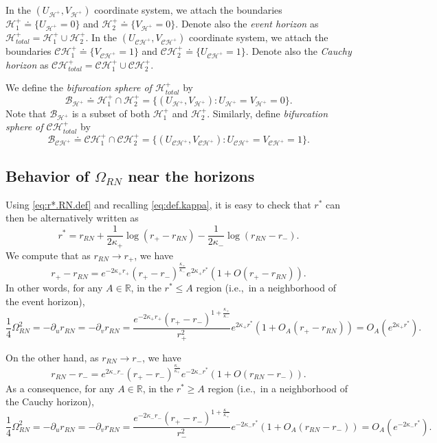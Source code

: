 \documentclass[10pt, reqno]{amsart}
\theoremstyle{definition}
\theoremstyle{remark}
\numberwithin{equation}{section}
\newcommand{\rd}{\partial}
\newcommand{\0}{\emptyset}
\newcommand{\Omg}{\Omega}
\newcommand{\calC}{\mathcal C}
\newcommand{\calH}{\mathcal H}
\newcommand{\f}{\frac}
\newcommand{\CH}{\calC \calH^{+}}		%
\newcommand{\EH}{\calH^{+}}
\begin{document}
In the $(U_{\EH},V_{\EH})$ coordinate system, we attach the boundaries $\EH_1\doteq \{U_{\EH}=0\}$ and $\EH_2\doteq \{V_{\EH}=0\}$. Denote also the \emph{event horizon} as $\EH_{total}=\EH_1\cup\EH_2$. In the $(U_{\CH},V_{\CH})$ coordinate system, we attach the boundaries $\CH_1 \doteq \{V_{\CH}=1\}$ and $\CH_2  \doteq \{U_{\CH}=1\}$. Denote also the \emph{Cauchy horizon} as $\CH_{total}=\CH_1\cup\CH_2$. 

We define the \emph{bifurcation sphere of $\EH_{total}$} by
$$\mathcal B_{\EH} \doteq \EH_1\cap \EH_2 = \{(U_{\EH},V_{\EH}):U_{\EH}=V_{\EH}=0\}.$$
Note that $\mathcal B_{\EH}$ is a subset of both $\EH_1$ and $\EH_2$. Similarly, define \emph{bifurcation sphere of $\CH_{total}$} by
$$\mathcal B_{\CH} \doteq \CH_1\cap \CH_2 = \{(U_{\CH},V_{\CH}):U_{\CH}=V_{\CH}=1\}.$$ 

\subsection{Behavior of $\Omg_{RN}$ near the horizons}
Using \eqref{eq:r*.RN.def} and recalling \eqref{eq:def.kappa}, it is easy to check that $r^*$ can then be alternatively written as
\begin{equation}\label{eq:def.r^*}
r^*=r_{RN}+\f{1}{2\kappa_+}\log (r_+-r_{RN}) -\f{1}{2\kappa_-}\log (r_{RN}-r_-).
\end{equation}
We compute that as $r_{RN}\to r_+$, we have
$$r_+-r_{RN}=e^{-2\kappa_+ r_+}(r_+-r_-)^{\f{\kappa_+}{\kappa_-}}e^{2\kappa_+ r^*}(1+O(r_+-r_{RN})).$$
In other words, for any $A\in \mathbb R$, in the $r^* \leq A$ region (i.e.,~in a neighborhood of the event horizon),
\begin{equation}\label{eq:Omg.near.H}
\f 14\Omg_{RN}^2=-\rd_u r_{RN}=-\rd_v r_{RN}=\f{e^{-2\kappa_+ r_+}(r_+-r_-)^{1+\f{\kappa_+}{\kappa_-}}}{r_+^2}e^{2\kappa_+ r^*}(1+O_A(r_+-r_{RN}))= O_A(e^{2\kappa_+ r^*}).
\end{equation}

On the other hand, as $r_{RN}\to r_-$, we have
$$r_{RN}-r_-=e^{2\kappa_-r_-}(r_+-r_-)^{\f{\kappa_-}{\kappa_+}}e^{-2\kappa_-r^*}(1+O(r_{RN}-r_-)).$$
As a consequence, for any $A\in \mathbb R$, in the $r^* \geq A$ region (i.e.,~in a neighborhood of the Cauchy horizon),
\begin{equation}\label{eq:Omg.near.CH}
\f 14\Omg_{RN}^2=-\rd_u r_{RN}=-\rd_v r_{RN}=\f{e^{-2\kappa_-r_-}(r_+-r_-)^{1+\f{\kappa_-}{\kappa_+}}}{r_-^2}e^{-2\kappa_-r^*}(1+O_A(r_{RN}-r_-))= O_A(e^{-2\kappa_-r^*}).
\end{equation}
\end{document}
